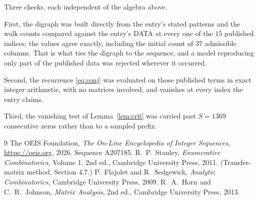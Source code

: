 \documentclass[11pt,a4paper]{article}
\theoremstyle{plain}
\theoremstyle{definition}
\begin{document}
Three checks, each independent of the algebra above.

First, the digraph was built directly from the entry's stated patterns and the walk counts
compared against the entry's DATA at every one of the $15$ published indices; the
values agree exactly, including the initial count of $37$ admissible columns. That is
what ties the digraph to the sequence, and a model reproducing only part of the published
data was rejected wherever it occurred.

Second, the recurrence \eqref{eq:conj} was evaluated on those published terms in exact
integer arithmetic, with no matrices involved, and vanishes at every index the entry claims.

Third, the vanishing test of Lemma~\ref{lem:crit} was carried past $S=1369$ consecutive
zeros rather than to a sampled prefix.

\begin{thebibliography}{9}
 The OEIS Foundation, \emph{The On-Line Encyclopedia of Integer
Sequences}, \url{https://oeis.org}, 2026. Sequence A207185.
 R.~P.~Stanley, \emph{Enumerative Combinatorics}, Volume 1, 2nd ed.,
Cambridge University Press, 2011. (Transfer-matrix method, Section 4.7.)
 P.~Flajolet and R.~Sedgewick, \emph{Analytic Combinatorics}, Cambridge
University Press, 2009.
 R.~A.~Horn and C.~R.~Johnson, \emph{Matrix Analysis}, 2nd ed., Cambridge
University Press, 2013.
\end{thebibliography}
\end{document}
